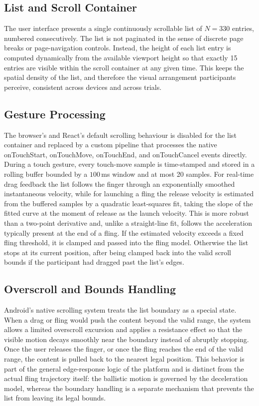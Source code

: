 \subsection{List and Scroll Container}

The user interface presents a single continuously scrollable list of $N = 330$ entries, numbered consecutively. The list is not paginated in the sense of discrete page breaks or page-navigation controls. Instead, the height of each list entry is computed dynamically from the available viewport height so that exactly 15 entries are visible within the scroll container at any given time. This keeps the spatial density of the list, and therefore the visual arrangement participants perceive, consistent across devices and across trials.

\subsection{Gesture Processing}

The browser's and React's default scrolling behaviour is disabled for the list container and replaced by a custom pipeline that processes the native onTouchStart, onTouchMove, onTouchEnd, and onTouchCancel events directly. During a touch gesture, every touch-move sample is time-stamped and stored in a rolling buffer bounded by a $100$\,ms window and at most 20 samples. For real-time drag feedback the list follows the finger through an exponentially smoothed instantaneous velocity, while for launching a fling the release velocity is estimated from the buffered samples by a quadratic least-squares fit, taking the slope of the fitted curve at the moment of release as the launch velocity. This is more robust than a two-point derivative and, unlike a straight-line fit, follows the acceleration typically present at the end of a fling. If the estimated velocity exceeds a fixed fling threshold, it is clamped and passed into the fling model. Otherwise the list stops at its current position, after being clamped back into the valid scroll bounds if the participant had dragged past the list's edges.

\subsection{Overscroll and Bounds Handling}

Android's native scrolling system treats the list boundary as a special state. When a drag or fling would push the content beyond the valid range, the system allows a limited overscroll excursion and applies a resistance effect so that the visible motion decays smoothly near the boundary instead of abruptly stopping. Once the user releases the finger, or once the fling reaches the end of the valid range, the content is pulled back to the nearest legal position. This behavior is part of the general edge-response logic of the platform and is distinct from the actual fling trajectory itself: the ballistic motion is governed by the deceleration model, whereas the boundary handling is a separate mechanism that prevents the list from leaving its legal bounds.

